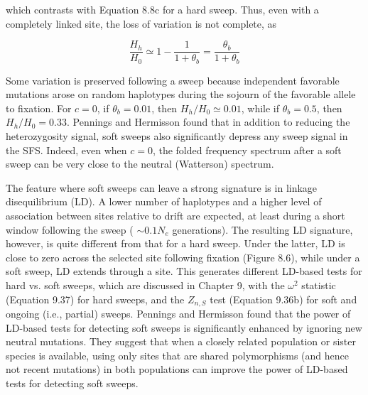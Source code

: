 \documentclass{article}
\begin{document}
which contrasts with Equation 8.8c for a hard sweep. Thus, even with a completely linked site, the loss of variation is not complete, as

\begin{equation}
\frac{H_{h}}{H_{0}}\simeq1-\frac{1}{1+\theta_{b}}=\frac{\theta_{b}}{1+\theta_{b}}
\tag{8.16b}
\label{eq:8_16b}
\end{equation}

Some variation is preserved following a sweep because independent favorable mutations arose on random haplotypes during the sojourn of the favorable allele to fixation. For  $ c = 0 $, if  $ \theta_b = 0.01 $, then  $ H_h / H_0 \simeq 0.01 $, while if  $ \theta_b = 0.5 $, then  $ H_h / H_0 = 0.33 $. Pennings and Hermisson found that in addition to reducing the heterozygosity signal, soft sweeps also significantly depress any sweep signal in the SFS. Indeed, even when  $ c = 0 $, the folded frequency spectrum after a soft sweep can be very close to the neutral (Watterson) spectrum.

The feature where soft sweeps can leave a strong signature is in linkage disequilibrium (LD). A lower number of haplotypes and a higher level of association between sites relative to drift are expected, at least during a short window following the sweep ( $ \sim0.1N_e $ generations). The resulting LD signature, however, is quite different from that for a hard sweep. Under the latter, LD is close to zero across the selected site following fixation (Figure 8.6), while under a soft sweep, LD extends through a site. This generates different LD-based tests for hard vs. soft sweeps, which are discussed in Chapter 9, with the  $ \omega^2 $ statistic (Equation 9.37) for hard sweeps, and the  $ Z_{n,S} $ test (Equation 9.36b) for soft and ongoing (i.e., partial) sweeps. Pennings and Hermisson found that the power of LD-based tests for detecting soft sweeps is significantly enhanced by ignoring new neutral mutations. They suggest that when a closely related population or sister species is available, using only sites that are shared polymorphisms (and hence not recent mutations) in both populations can improve the power of LD-based tests for detecting soft sweeps.
\end{document}
